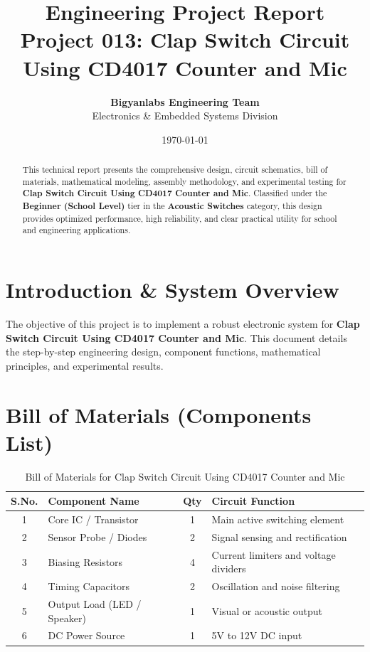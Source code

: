 \documentclass[11pt,a4paper]{article}
\title{\textbf{\Huge Engineering Project Report}\\[0.5em] \Large Project 013: Clap Switch Circuit Using CD4017 Counter and Mic}
\author{\textbf{Bigyanlabs Engineering Team}\\ Electronics \& Embedded Systems Division}
\date{\today}
\begin{document}
\maketitle
\thispagestyle{empty}

\begin{abstract}
This technical report presents the comprehensive design, circuit schematics, bill of materials, mathematical modeling, assembly methodology, and experimental testing for \textbf{Clap Switch Circuit Using CD4017 Counter and Mic}. Classified under the \textbf{Beginner (School Level)} tier in the \textbf{Acoustic Switches} category, this design provides optimized performance, high reliability, and clear practical utility for school and engineering applications.
\end{abstract}

\newpage
\tableofcontents
\newpage

\section{Introduction \& System Overview}
The objective of this project is to implement a robust electronic system for \textbf{Clap Switch Circuit Using CD4017 Counter and Mic}. This document details the step-by-step engineering design, component functions, mathematical principles, and experimental results.

\section{Bill of Materials (Components List)}
\begin{table}[h!]
\centering
\caption{Bill of Materials for Clap Switch Circuit Using CD4017 Counter and Mic}
\vspace{0.5em}
\begin{tabular}{clcp{7cm}}
\toprule
\textbf{S.No.} & \textbf{Component Name} & \textbf{Qty} & \textbf{Circuit Function} \\
\midrule
1 & Core IC / Transistor & 1 & Main active switching element \\
2 & Sensor Probe / Diodes & 2 & Signal sensing and rectification \\
3 & Biasing Resistors & 4 & Current limiters and voltage dividers \\
4 & Timing Capacitors & 2 & Oscillation and noise filtering \\
5 & Output Load (LED / Speaker) & 1 & Visual or acoustic output \\
6 & DC Power Source & 1 & 5V to 12V DC input \\
\bottomrule
\end{tabular}
\end{table}
\end{document}
